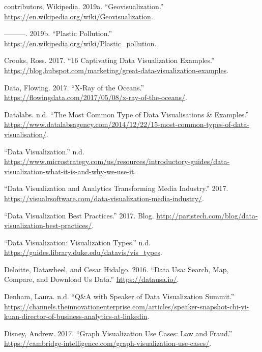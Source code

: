 \documentclass[]{book}
\begin{document}
\leavevmode\hypertarget{ref-Wikipedia}{}%
contributors, Wikipedia. 2019a. ``Geovisualization.'' \url{https://en.wikipedia.org/wiki/Geovisualization}.

\leavevmode\hypertarget{ref-wiki_plastic_pollution}{}%
---------. 2019b. ``Plastic Pollution.'' \url{https://en.wikipedia.org/wiki/Plastic_pollution}.

\leavevmode\hypertarget{ref-int_viz_capt}{}%
Crooks, Ross. 2017. ``16 Captivating Data Visualization Examples.'' \url{https://blog.hubspot.com/marketing/great-data-visualization-examples}.

\leavevmode\hypertarget{ref-Ocean-XRay}{}%
Data, Flowing. 2017. ``X-Ray of the Oceans.'' \url{https://flowingdata.com/2017/05/08/x-ray-of-the-oceans/}.

\leavevmode\hypertarget{ref-chart-desp}{}%
Datalabs. n.d. ``The Most Common Type of Data Visualisations \& Examples.'' \url{https://www.datalabsagency.com/2014/12/22/15-most-common-types-of-data-visualisation/}.

\leavevmode\hypertarget{ref-data_viz_importance1}{}%
``Data Visualization.'' n.d. \url{https://www.microstrategy.com/us/resources/introductory-guides/data-visualization-what-it-is-and-why-we-use-it}.

\leavevmode\hypertarget{ref-media_viz}{}%
``Data Visualization and Analytics Transforming Media Industry.'' 2017. \url{https://visualrsoftware.com/data-visualization-media-industry/}.

\leavevmode\hypertarget{ref-VizBP}{}%
``Data Visualization Best Practices.'' 2017. Blog. \url{http://paristech.com/blog/data-visualization-best-practices/}.

\leavevmode\hypertarget{ref-treemap}{}%
``Data Visualization: Visualization Types.'' n.d. \url{https://guides.library.duke.edu/datavis/vis_types}.

\leavevmode\hypertarget{ref-DataUSA}{}%
Deloitte, Datawheel, and Cesar Hidalgo. 2016. ``Data Usa: Search, Map, Compare, and Download Us Data.'' \url{https://datausa.io/}.

\leavevmode\hypertarget{ref-speaker_notes}{}%
Denham, Laura. n.d. ``Q\&A with Speaker of Data Visualization Summit.'' \url{https://channels.theinnovationenterprise.com/articles/speaker-snapshot-chi-yi-kuan-director-of-business-analytics-at-linkedin}.

\leavevmode\hypertarget{ref-lawfraud}{}%
Disney, Andrew. 2017. ``Graph Visualization Use Cases: Law and Fraud.'' \url{https://cambridge-intelligence.com/graph-visualization-use-cases/}.
\end{document}
